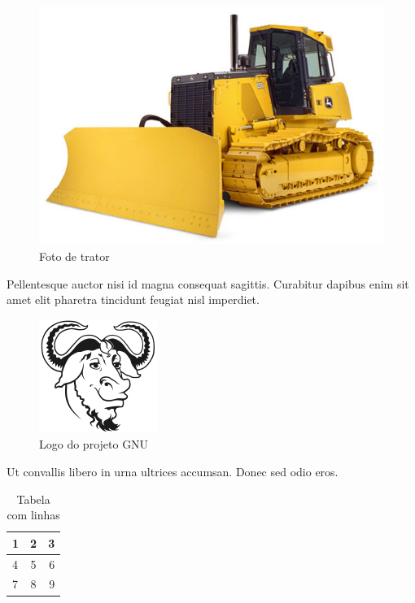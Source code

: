 \documentclass{article}
\begin{document}
\begin{figure}[h]
\center
\includegraphics[scale=0.3]{trator.jpg}
\caption{Foto de trator}
\end{figure}

Pellentesque auctor nisi id magna consequat sagittis. Curabitur dapibus enim
sit amet elit pharetra tincidunt feugiat nisl imperdiet.

\begin{figure}[h]
\center
\includegraphics[scale=1.0]{heckert_gnu_small.png}
\caption{Logo do projeto GNU}
\end{figure}

Ut convallis libero in urna ultrices accumsan. Donec sed odio eros.

\begin{table}
  \begin{tabular}{|l|c|r|}
    \hline
    1 & 2 & 3 \\ \hline
    4 & 5 & 6 \\ \hline
    7 & 8 & 9 \\ \hline
  \end{tabular}
  \caption{Tabela com linhas}
\end{table}

\listoffigures
\listoftables
\end{document}
